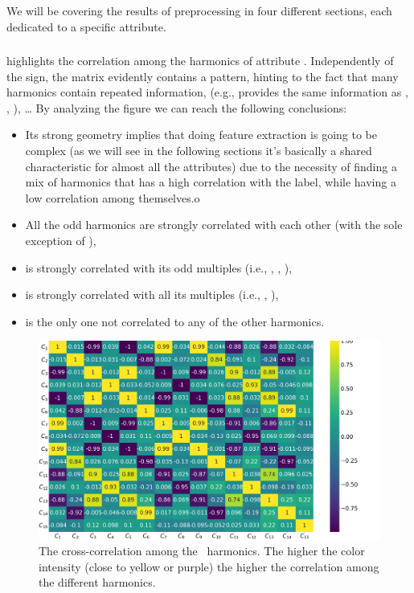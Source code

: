 We will be covering the results of preprocessing in four different sections, each dedicated to a
specific attribute.

\subsubsection{\an}
 highlights the correlation among the harmonics of attribute \an. Independently of
the sign, the matrix evidently contains a pattern, hinting to the fact that many harmonics contain
repeated information, (e.g., \an[1] provides the same information as \an[3], \an[5], \an[7]), \ldots
By analyzing the figure we can reach the following conclusions:
\begin{itemize}
	\item Its strong geometry implies that doing feature extraction is going to be complex (as
	      we will see in the following sections it's basically a shared characteristic for
	      almost all the attributes) due to the necessity of finding a mix of harmonics that
	      has a high correlation with the label, while having a low correlation among
	      themselves.o
	\item All the odd harmonics are strongly correlated with each other (with the sole exception
	      of \an[15]),
	\item \an[2] is strongly correlated with its odd multiples (i.e., \an[6], \an[10], \an[14]),
	\item \an[4] is strongly correlated with all its multiples (i.e., \an[8], \an[12]),
	\item \an[15] is the only one not correlated to any of the other harmonics.
\end{itemize}
\begin{figure}[!ht]
	\centering
	\includegraphics[width=\linewidth]{img/An_corr_matrix.png}
	\caption{The cross-correlation among the \an\ harmonics. The higher the color intensity
		(close to yellow or purple) the higher the correlation among the different harmonics.} \label{fig:an-corr}
\end{figure}

